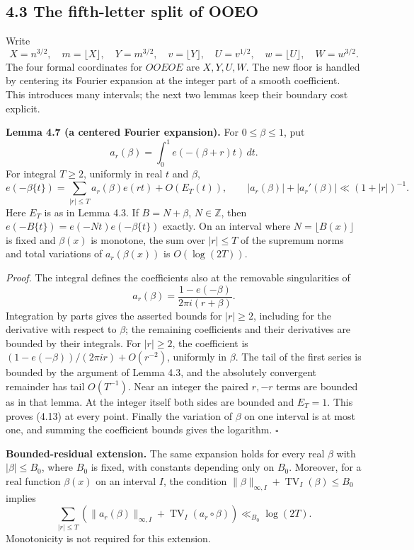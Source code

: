 \documentclass[11pt,a4paper]{article}
\begin{document}
\subsection{4.3 The fifth-letter split of
OOEO}\label{the-fifth-letter-split-of-ooeo}

Write \[
X=n^{3/2},\quad m=\lfloor X\rfloor,\quad Y=m^{3/2},
\quad v=\lfloor Y\rfloor,\quad U=v^{1/2},\quad
w=\lfloor U\rfloor,\quad W=w^{3/2}.
\] The four formal coordinates for \(OOEOE\) are \(X,Y,U,W\). The new
floor is handled by centering its Fourier expansion at the integer part
of a smooth coefficient. This introduces many intervals; the next two
lemmas keep their boundary cost explicit.


\textbf{Lemma 4.7 (a centered Fourier expansion).} For
\(0\le\beta\le1\), put \[
a_r(\beta)=\int_0^1e(-(\beta+r)t)\,dt .
\] For integral \(T\ge2\), uniformly in real \(t\) and \(\beta\), \[
e(-\beta\{t\})=\sum_{|r|\le T}a_r(\beta)e(rt)+O(E_T(t)),
\qquad
|a_r(\beta)|+|a_r'(\beta)|\ll(1+|r|)^{-1}.
\tag{4.13}
\] Here \(E_T\) is as in Lemma 4.3. If \(B=N+\beta\), \(N\in\mathbb Z\),
then \(e(-B\{t\})=e(-Nt)e(-\beta\{t\})\) exactly. On an interval where
\(N=\lfloor B(x)\rfloor\) is fixed and \(\beta(x)\) is monotone, the sum
over \(|r|\le T\) of the supremum norms and total variations of
\(a_r(\beta(x))\) is \(O(\log(2T))\).

\emph{Proof.} The integral defines the coefficients also at the
removable singularities of \[
a_r(\beta)=\frac{1-e(-\beta)}{2\pi i(r+\beta)}.
\] Integration by parts gives the asserted bounds for \(|r|\ge2\),
including for the derivative with respect to \(\beta\); the remaining
coefficients and their derivatives are bounded by their integrals. For
\(|r|\ge2\), the coefficient is \((1-e(-\beta))/(2\pi ir)+O(r^{-2})\),
uniformly in \(\beta\). The tail of the first series is bounded by the
argument of Lemma 4.3, and the absolutely convergent remainder has tail
\(O(T^{-1})\). Near an integer the paired \(r,-r\) terms are bounded as
in that lemma. At the integer itself both sides are bounded and
\(E_T=1\). This proves (4.13) at every point. Finally the variation of
\(\beta\) on one interval is at most one, and summing the coefficient
bounds gives the logarithm. \(\square\)

\textbf{Bounded-residual extension.} The same expansion holds for every
real \(\beta\) with \(|\beta|\le B_0\), where \(B_0\) is fixed, with
constants depending only on \(B_0\). Moreover, for a real function
\(\beta(x)\) on an interval \(I\), the condition
\(\|\beta\|_{\infty,I}+\operatorname{TV}_I(\beta)\le B_0\) implies \[
\sum_{|r|\le T}\left(\|a_r(\beta)\|_{\infty,I}
+\operatorname{TV}_I(a_r\circ\beta)\right)
\ll_{B_0}\log(2T).
\] Monotonicity is not required for this extension.
\end{document}
